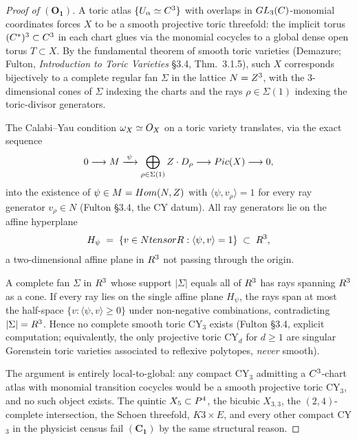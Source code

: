 \begin{proof}[Proof of $(\mathbf{O_1})$]
A toric atlas $\{U_\alpha \simeq C^3\}$ with overlaps in
$GL_3(C)$-monomial coordinates forces $X$ to be a smooth
projective toric threefold: the implicit torus $(C^*)^3 \subset
C^3$ in each chart glues via the monomial cocycles to a global dense
open torus $T \subset X$. By the fundamental theorem of smooth toric
varieties (Demazure; Fulton, \emph{Introduction to Toric Varieties}
\S3.4, Thm.~3.1.5), such $X$ corresponds bijectively to a complete
regular fan $\Sigma$ in the lattice $N = Z^3$, with the $3$-dimensional
cones of $\Sigma$ indexing the charts and the rays $\rho \in \Sigma(1)$
indexing the toric-divisor generators.

The Calabi--Yau condition $\omega_X \simeq O_X$ on a toric variety
translates, via the exact sequence
\[
  0 \longrightarrow M \xrightarrow{\;\psi\;}
  \bigoplus_{\rho \in \Sigma(1)} Z\cdot D_\rho
  \longrightarrow Pic(X) \longrightarrow 0,
\]
into the existence of $\psi \in M = Hom(N, Z)$ with
$\langle \psi, v_\rho\rangle = 1$ for every ray generator
$v_\rho \in N$ (Fulton \S3.4, the CY datum). All ray generators lie on
the affine hyperplane
\[
  H_\psi \;=\; \{v \in N tensor R : \langle \psi, v\rangle = 1\}
  \;\subset\; R^3,
\]
a two-dimensional affine plane in $R^3$ not passing through the origin.

A complete fan $\Sigma$ in $R^3$ whose support $|\Sigma|$ equals all
of $R^3$ has rays spanning $R^3$ as a cone. If every ray lies on
the single affine plane $H_\psi$, the rays span at most the
half-space $\{v : \langle \psi, v\rangle \geq 0\}$ under non-negative
combinations, contradicting $|\Sigma| = R^3$. Hence no complete
smooth toric CY$_3$ exists (Fulton \S3.4, explicit computation;
equivalently, the only projective toric CY$_d$ for $d \geq 1$ are
singular Gorenstein toric varieties associated to reflexive polytopes,
\emph{never} smooth).

The argument is entirely local-to-global: any compact CY$_3$ admitting
a $C^3$-chart atlas with monomial transition cocycles would be a
smooth projective toric CY$_3$, and no such object exists. The quintic
$X_5 \subset P^4$, the bicubic $X_{3,3}$, the $(2,4)$-complete
intersection, the Schoen threefold, $K3 \times E$, and every other
compact CY$_3$ in the physicist census fail $(\mathbf{C_1})$ by the
same structural reason.
\end{proof}

